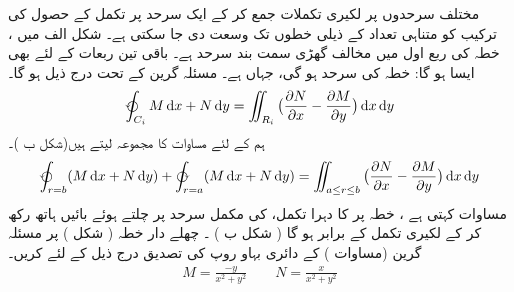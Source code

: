    مختلف سرحدوں پر لکیری تکملات  جمع کر کے ایک سرحد پر تکمل کے حصول کی ترکیب  کو متناہی تعداد کے ذیلی خطوں تک وسعت دی جا سکتی ہے۔ شکل الف  میں ، خطہ   کی   ربع اول  میں  مخالف گھڑی سمت بند سرحد    ہے۔ باقی تین  ربعات کے لئے بھی ایسا ہو گا:    خطہ  کی سرحد   ہو گی، جہاں    ہے۔ مسئلہ  گرین کے تحت  درج ذیل ہو گا۔ 
\begin{align}\label{مساوات_سمتی_تکمل_چار_حصے}
     \varointctrclockwise_{C_i} M \dif x + N \dif y = \iint_{R_i} \big(\frac{\partial N}{\partial x} -  \frac{\partial M}{\partial y}\big) \dif x \dif y 
\end{align}
 ہم  کے لئے  مساوات      کا مجموعہ  لیتے ہیں(شکل     ب )۔
\begin{align}\label{مساوات_سمتی_تکمل_چار_مجموعہ}
     \varointctrclockwise_{r=b} (M \dif x + N \dif y) + \varointclockwise_{r=a} (M \dif x + N \dif y) = \iint_{a\leq r \leq b} \big(\frac{\partial N}{\partial x} -  \frac{\partial M}{\partial y}\big) \dif x \dif y 
\end{align}
 مساوات      کہتی ہے   ،  خطہ 
  پر   کا دہرا  تکمل،   کی مکمل  سرحد پر چلتے ہوئے  بائیں ہاتھ رکھ کر   کے   لکیری تکمل   کے برابر ہو گا  ( شکل      ب   )  ۔
 چھلے دار  خطہ  ( شکل    ) پر  مسئلہ  گرین (مساوات  ) کے  دائری بہاو روپ کی تصدیق  درج ذیل کے لئے کریں۔
\begin{align*}
  M = \frac{-y}{x^2 + y^2} \quad\quad N=\frac{x}{x^2 + y^2}  
\end{align*}

